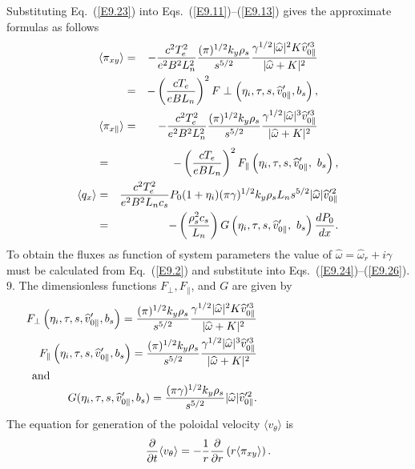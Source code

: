 \documentclass[a4paper,openany,12pt]{book}
\begin{document}
{Substituting Eq.~(\ref{E9.23}) into Eqs.~(\ref{E9.11})--(\ref{E9.13}) gives the approximate formulas as follows\\
\begin{eqnarray}
\langle\pi_{xy}\rangle&=&-{c^2T_e^2\over e^2B^2L_n^2}
{(\pi)^{1/2}k_y\rho_s\over s^{5/2}}{\gamma^{1/2}|\widehat\omega|^2K\widehat v'^3_{0\|}\over|\widehat\omega+K|^2}\nonumber\\
&=&-\left({cT_e\over eBL_n}\right)^2 F\perp\left(\eta_i, \tau, s,\widehat v'_{0\|}, b_s\right),\label{E9.57}\\ 
\langle\pi_{x\|}\rangle&=& -{c^2T_e^2\over e^2B^2L_n^2}
{(\pi)^{1/2}k_y\rho_s\over s^{5/2}}{\gamma^{1/2}|\widehat\omega|^3\widehat v'^3_{0\|}\over|\widehat\omega+K|^2}\nonumber
\end{eqnarray}
%
\begin{eqnarray}
&=&-\left({cT_e\over eBL_n}\right)^2F_\|\left(\eta_i, \tau, s,\widehat v'_{0\|},\ b_s\right),\label{E9.58}\\
\langle q_x\rangle&=&{c^2T_e^2\over e^2B^2L_n c_s}{P_0(1+\eta_i)(\pi\gamma)^{1/2}
k_y\rho_s}{L_n s^{5/2}}|\widehat\omega|\widehat v'^2_{0\|}\nonumber\\
&=&-\left({\rho_s^2c_s\over L_n}\right)G\left(\eta_i, \tau, s,\widehat v'_{0\|},\ b_s\right)
{dP_0\over dx}.\label{E9.59}
\end{eqnarray}
To obtain the fluxes as function of system parameters the value of $\widehat\omega=\widehat\omega_r+i\gamma$ must be calculated from Eq.~(\ref{E9.2}) and substitute into Eqs.~(\ref{E9.24})--(\ref{E9.26}).
9. The dimensionless functions $F_\perp, F_\|$, and $G$ are given by
\begin{eqnarray*}
&&F_\perp\left(\eta_i, \tau, s,\widehat v'_{0\|}, b_s\right)={(\pi)^{1/2}k_y\rho_s
\over s^{5/2}}{\gamma^{1/2}|\widehat\omega|^2K\widehat v'^3_{0\|}\over|\widehat\omega+K|^2}\\
&&F_\|\left(\eta_i, \tau, s, \widehat v'_{0\|}, b_s\right)={(\pi)^{1/2}k_y\rho_s\over s^{5/2}}{\gamma^{1/2}|\widehat\omega|^3\widehat v'^3_{0\|}\over|\widehat\omega+K|^2}\\
\noalign{and}
&&G(\eta_i, \tau, s, \widehat v'_{0\|}, b_s)={(\pi\gamma)^{1/2}k_y\rho_s\over s^{5/2}}|\widehat\omega|\widehat v'^2_{0\|}.
\end{eqnarray*}
The equation for generation of the poloidal velocity $\langle v_\theta\rangle$ is
\begin{equation}
{\partial\over\partial t}\langle v_\theta\rangle=-{1\over r}{\partial\over\partial r}\left(r\langle\pi_{xy}\rangle\right).\label{E9.60}
\end{equation}

}
\end{document}
